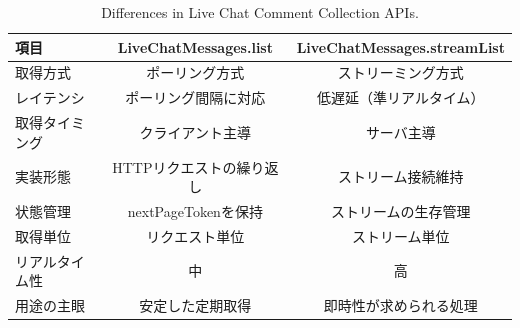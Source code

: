 \begin{table}[htbp]
    \centering
    \caption{Differences in Live Chat Comment Collection APIs.}
    \label{tab:youtube_live_chat_api}
    \begin{tabular}{lcc}
    \hline
    項目 & LiveChatMessages.list & LiveChatMessages.streamList \\
    \hline
    取得方式 & ポーリング方式 & ストリーミング方式 \\
    レイテンシ & ポーリング間隔に対応 & 低遅延（準リアルタイム） \\
    取得タイミング & クライアント主導 & サーバ主導 \\
    実装形態 & HTTPリクエストの繰り返し & ストリーム接続維持 \\
    状態管理 & nextPageTokenを保持 & ストリームの生存管理 \\
    取得単位 & リクエスト単位 & ストリーム単位 \\
    リアルタイム性 & 中 & 高 \\
    用途の主眼 & 安定した定期取得 & 即時性が求められる処理 \\
    \hline
    \end{tabular}
\end{table}
